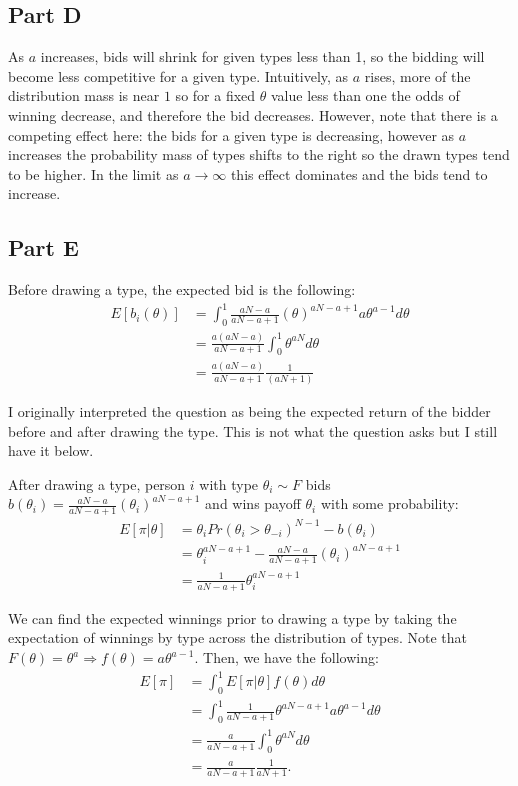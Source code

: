 \documentclass[11pt]{article} %
\begin{document}
\subsection{Part D}
As $a$ increases, bids will shrink for given types less than 1, so the bidding will become less competitive for a given type. Intuitively, as $a$ rises, more of the distribution mass is near $1$ so for a fixed $\theta$ value less than one the odds of winning decrease, and therefore the bid decreases. However, note that there is a competing effect here: the bids for a given type is decreasing, however as $a$ increases the probability mass of types shifts to the right so the drawn types tend to be higher. In the limit as $a\rightarrow \infty$ this effect dominates and the bids tend to increase. 
\subsection{Part E}

Before drawing a type, the expected bid is the following:
\begin{align*}
E[b_i(\theta)] &= \int_{0}^{1} \frac{aN-a}{aN-a+1}(\theta)^{aN-a+1}  a\theta^{a-1} d\theta \\
&=  \frac{a(aN-a)}{aN-a+1} \int_{0}^{1}\theta^{aN}d\theta\\
&=   \frac{a(aN-a)}{aN-a+1}\frac{1}{(aN+1)} 
\end{align*}

I originally interpreted the question as being the expected return of the bidder before and after drawing the type. This is not what the question asks but I still have it below.

After drawing a type, person $i$ with type $\theta_i \sim F$ bids $b(\theta_i) =  \frac{aN-a}{aN-a+1}(\theta_i)^{aN-a+1}$ and wins payoff $\theta_i$ with some probability:
\begin{align*}
E[\pi|\theta] &= \theta_i Pr(\theta_i>\theta_{-i})^{N-1} - b(\theta_i)\\
&= \theta_i^{aN-a+1} - \frac{aN-a}{aN-a+1}(\theta_i)^{aN-a+1}\\
&= \frac{1}{aN - a + 1}\theta_i^{aN-a+1}
\end{align*}

We can find the expected winnings prior to drawing a type by taking the expectation of winnings by type across the distribution of types. Note that $F(\theta) = \theta^a \Rightarrow f(\theta) = a\theta^{a-1}$. Then, we have the following:
\begin{align*}
E[\pi] &= \int_{0}^1 E[\pi|\theta] f(\theta)d\theta \\
&=  \int_{0}^1\frac{1}{aN - a + 1}\theta^{aN-a+1} a\theta^{a-1}d\theta\\
&= \frac{a}{aN - a + 1}\int_{0}^1\theta^{aN} d\theta\\
&=  \frac{a}{aN - a + 1} \frac{1}{aN+1}.
\end{align*}
\end{document}
